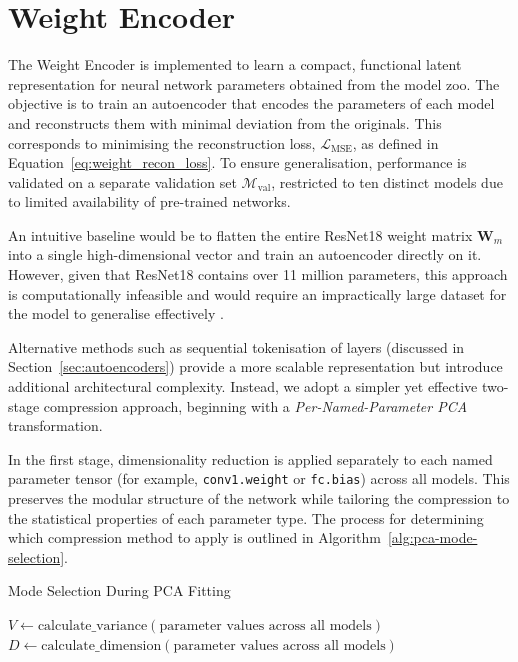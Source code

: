 \section{Weight Encoder}
\label{sec:weight_enc}
The Weight Encoder is implemented to learn a compact, functional latent representation for neural network parameters obtained from the model zoo. The objective is to train an autoencoder that encodes the parameters of each model and reconstructs them with minimal deviation from the originals. This corresponds to minimising the reconstruction loss, $\mathcal{L}_{\text{MSE}}$, as defined in Equation~\ref{eq:weight_recon_loss}. To ensure generalisation, performance is validated on a separate validation set $\mathcal{M}_{\text{val}}$, restricted to ten distinct models due to limited availability of pre-trained networks.

An intuitive baseline would be to flatten the entire ResNet18 weight matrix $\mathbf{W}_m$ into a single high-dimensional vector and train an autoencoder directly on it. However, given that ResNet18 contains over 11 million parameters, this approach is computationally infeasible and would require an impractically large dataset for the model to generalise effectively \cite{some_reference}.  

Alternative methods such as sequential tokenisation of layers (discussed in Section~\ref{sec:autoencoders}) provide a more scalable representation but introduce additional architectural complexity. Instead, we adopt a simpler yet effective two-stage compression approach, beginning with a \textit{Per-Named-Parameter PCA} transformation.  

In the first stage, dimensionality reduction is applied separately to each named parameter tensor (for example, \texttt{conv1.weight} or \texttt{fc.bias}) across all models. This preserves the modular structure of the network while tailoring the compression to the statistical properties of each parameter type. The process for determining which compression method to apply is outlined in Algorithm~\ref{alg:pca-mode-selection}.

\begin{algorithm}[H]
\caption{Mode Selection During PCA Fitting}
\label{alg:pca-mode-selection}
\begin{algorithmic}[1]
    \State $V \gets \text{calculate\_variance}(\text{parameter values across all models})$
    \State $D \gets \text{calculate\_dimension}(\text{parameter values across all models})$
        \State {} 
        \State {} 
    \Else
        \State {} 
    \EndIf
\EndFor
\end{algorithmic}
\end{algorithm}

